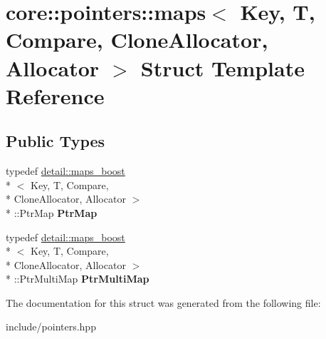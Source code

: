 \hypertarget{structcore_1_1pointers_1_1maps}{\section{core\-:\-:pointers\-:\-:maps$<$ Key, T, Compare, Clone\-Allocator, Allocator $>$ Struct Template Reference}
\label{structcore_1_1pointers_1_1maps}
}
\subsection*{Public Types}
\begin{DoxyCompactItemize}
\item 
\hypertarget{structcore_1_1pointers_1_1maps_a3da35c3d7dce764f0a405ed50fac69d1}{typedef \hyperlink{structcore_1_1pointers_1_1detail_1_1maps__boost}{detail\-::maps\-\_\-boost}\\*
$<$ Key, T, Compare, \\*
Clone\-Allocator, Allocator $>$\\*
\-::Ptr\-Map {\bfseries Ptr\-Map}}\label{structcore_1_1pointers_1_1maps_a3da35c3d7dce764f0a405ed50fac69d1}

\item 
\hypertarget{structcore_1_1pointers_1_1maps_a12da14f6615e8650dc67a829d53a71b5}{typedef \hyperlink{structcore_1_1pointers_1_1detail_1_1maps__boost}{detail\-::maps\-\_\-boost}\\*
$<$ Key, T, Compare, \\*
Clone\-Allocator, Allocator $>$\\*
\-::Ptr\-Multi\-Map {\bfseries Ptr\-Multi\-Map}}\label{structcore_1_1pointers_1_1maps_a12da14f6615e8650dc67a829d53a71b5}

\end{DoxyCompactItemize}


The documentation for this struct was generated from the following file\-:\begin{DoxyCompactItemize}
\item 
include/pointers.\-hpp\end{DoxyCompactItemize}

